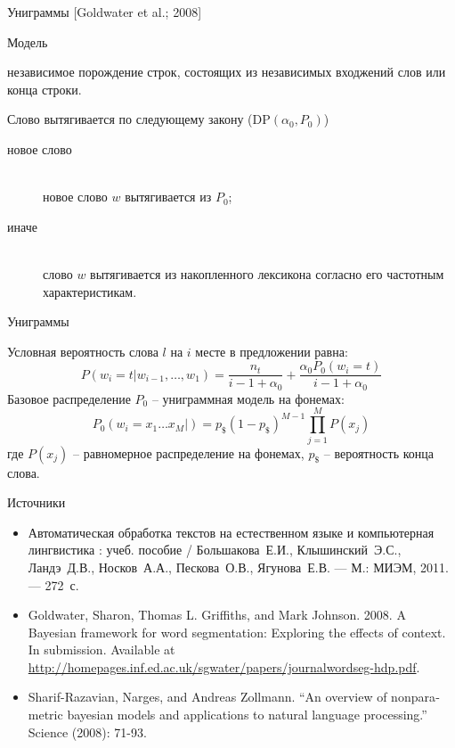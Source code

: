 \documentclass{beamer}
\newcommand{\eng}[1]{\foreignlanguage{english}{#1}}
\newcommand{\brac}[1]{\left ( #1 \right )}
\newcommand{\induc}[1]{\left . #1 \right \vert}
\begin{document}
\begin{frame}{Униграммы [\eng{Goldwater et al.; 2008}]}
  \begin{block}{Модель}

    независимое порождение строк, состоящих из независимых входжений слов или конца строки. 
  \end{block}

  \begin{block}

    Слово вытягивается по следующему закону ($\text{DP}\brac{\alpha_0,P_0}$)
    \begin{description}
      \item[новое слово]\hfill\\
        новое слово $w$ вытягивается из $P_0$;
        \item[иначе]\hfill\\
        слово $w$ вытягивается из накопленного лексикона согласно его частотным характеристикам.
    \end{description}    
  \end{block}
\end{frame}
\begin{frame}{Униграммы}
  \begin{block}

    Условная вероятность слова $l$ на $i$ месте в предложении равна:
    \[P\brac{\induc{w_i = t}w_{i-1},\ldots,w_1} = \frac{n_t}{i-1+\alpha_0} + \frac{\alpha_0 P_0(w_i = t)}{i-1+\alpha_0}\]
    Базовое распределение $P_0$ -- униграммная модель на фонемах:
    \[P_0\brac{\induc{w_i = x_1\ldots x_M}} = p_\$ \brac{1-p_\$}^{M-1} \prod_{j=1}^M P(x_j)\]
    где $P(x_j)$ -- равномерное распределение на фонемах, $p_\$$ -- вероятность конца слова.
  \end{block}
\end{frame}

\begin{frame}{Источники}
  \begin{block}

    \begin{itemize}
      \item Автоматическая обработка текстов на естественном языке и компьютерная лингвистика : учеб. пособие / Большакова~Е.И., Клышинский~Э.С., Ландэ~Д.В., Носков~А.А., Пескова~О.В., Ягунова~Е.В. — М.: МИЭМ, 2011. — 272~с.
      \item \eng{Goldwater, Sharon, Thomas L. Griffiths, and Mark Johnson. 2008. A Bayesian framework for word segmentation: Exploring the effects of context. In submission. Available at \url{http://homepages.inf.ed.ac.uk/sgwater/papers/journalwordseg-hdp.pdf}.}
      \item \eng{Sharif-Razavian, Narges, and Andreas Zollmann. ``An overview of nonparametric bayesian models and applications to natural language processing.'' Science (2008): 71-93.}
    \end{itemize}
  \end{block}
\end{frame}
\end{document}
